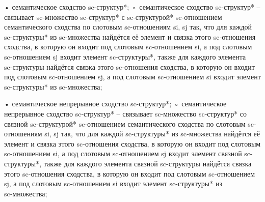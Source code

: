 \begin{SCn}
\end{SCn}
• семантическое сходство sc-структур*;
◦ семантическое сходство sc-структур* – связывает sc-множество sc-структур* с sc‑структурой* sc‑отношением семантического сходства по слотовым sc-отношениям si, sj так, что для каждой sc-структуры* из sc‑множества найдётся её элемент и связка этого sc‑отношения сходства, в которую он входит под слотовым sc‑отношением si, а под слотовым sc‑отношением sj входит элемент sc-структуры*, также для каждого элемента sc‑структуры найдётся связка этого sc-отношения сходства, в которую он входит под слотовым sc‑отношением sj, а под слотовым sc‑отношением si входит элемент sc-структуры* из sc‑множества;

\begin{SCn}
\end{SCn}
• семантическое непрерывное сходство sc-структур*;
◦ семантическое непрерывное сходство sc-структур* – связывает sc-множество sc‑структур* со связной sc‑структурой* sc‑отношением семантического сходства по слотовым sc-отношениям si, sj так, что для каждой sc-структуры* из sc‑множества найдётся её элемент и связка этого sc‑отношения сходства, в которую он входит под слотовым sc‑отношением si, а под слотовым sc‑отношением sj входит элемент связной sc-структуры*, также для каждого элемента связной sc-структуры найдётся связка этого sc-отношения сходства, в которую он входит под слотовым sc‑отношением sj, а под слотовым sc‑отношением si входит элемент sc-структуры* из sc‑множества;
%